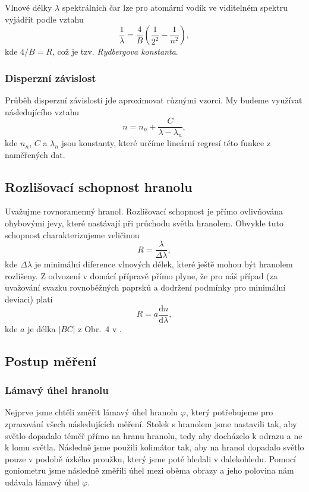 \documentclass[english]{article}
\newcommand{\dd}{\mathrm{d}}
\begin{document}
			Vlnové délky $\lambda$ spektrálních čar lze pro atomární vodík ve viditelném spektru vyjádřit podle vztahu 
			\begin{equation}
			\frac{1}{\lambda}=\frac{4}{B}\left( \frac{1}{2^2}-\frac{1}{n^2}\right),
			\label{eq:balmerova serie vodik}
			\end{equation}
			kde $4/B=R$, což je tzv. \emph{Rydbergova konstanta}.
		
		\subsubsection{Disperzní závislost}
			Průběh disperzní závislosti jde aproximovat různými vzorci. My budeme využívat následujícího vztahu
			\begin{equation}
			n=n_n+\frac{C}{\lambda-\lambda_n},
			\label{eq:disperzni zavislost}
			\end{equation}
			kde $n_n$, $C$ a $\lambda_n$ jsou konstanty, které určíme lineární regresí této funkce z naměřených dat.
		
		\subsection{Rozlišovací schopnost hranolu}
			Uvažujme rovnoramenný hranol. Rozlišovací schopnost je přímo ovlivňována ohybovými jevy, které nastávají při průchodu světla hranolem. Obvykle tuto schopnost charakterizujeme veličinou 
			\begin{equation}
				R=\frac{\lambda}{\Delta\lambda},
				\label{rzl_1}
			\end{equation}
			kde $\Delta\lambda$ je minimální diference vlnových délek, které ještě mohou být hranolem rozlišeny. Z odvození v domácí přípravě přímo plyne, že pro náš případ (za uvažování svazku rovnoběžných paprsků a dodržení podmínky pro minimální deviaci) platí 
			\begin{equation}
				R=a\frac{\dd n}{\dd \lambda},
				\label{rzl_2}
			\end{equation}
			kde $a$ je délka $|BC|$ z Obr.~4 v \cite{bib:zadani}.
				
	\subsection{Postup měření}
		\subsubsection{Lámavý úhel hranolu}
			Nejprve jsme chtěli změřit lámavý úhel hranolu $\varphi$, který potřebujeme pro zpracování všech následujících měření. Stolek s hranolem jsme nastavili tak, aby světlo dopadalo téměř přímo na hranu hranolu, tedy aby docházelo k odrazu a ne k lomu světla. Následně jsme použili kolimátor tak, aby na hranol dopadalo světlo pouze v podobě úzkého proužku, který jsme poté hledali v dalekohledu. Pomocí goniometru jsme následně změřili úhel mezi oběma obrazy a jeho polovina nám udávala lámavý úhel $\varphi$.
		
\end{document}
